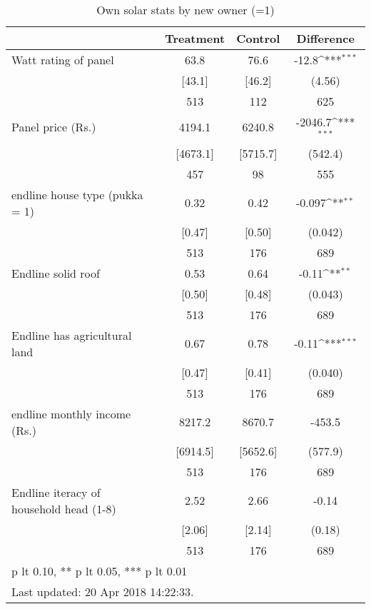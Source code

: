 \begin{table}[htbp]\centering
\def\sym#1{\ifmmode^{#1}\else\(^{#1}\)\fi}
\caption{Own solar stats by new owner (=1) \label{tab:"balance"}}
\begin{tabular*}{0.9\hsize}{@{\hskip\tabcolsep\extracolsep\fill}l*{1}{ccc}}
\toprule
                                &Treatment&  Control&Difference         \\
\midrule
Watt rating of panel            &     63.8&     76.6&    -12.8\sym{***}\\
                                &   [43.1]&   [46.2]&   (4.56)         \\
                                &      513&      112&      625         \\
Panel price (Rs.)               &   4194.1&   6240.8&  -2046.7\sym{***}\\
                                & [4673.1]& [5715.7]&  (542.4)         \\
                                &      457&       98&      555         \\
endline house type (pukka = 1)  &     0.32&     0.42&   -0.097\sym{**} \\
                                &   [0.47]&   [0.50]&  (0.042)         \\
                                &      513&      176&      689         \\
Endline solid roof              &     0.53&     0.64&    -0.11\sym{**} \\
                                &   [0.50]&   [0.48]&  (0.043)         \\
                                &      513&      176&      689         \\
Endline has agricultural land   &     0.67&     0.78&    -0.11\sym{***}\\
                                &   [0.47]&   [0.41]&  (0.040)         \\
                                &      513&      176&      689         \\
endline monthly income (Rs.)    &   8217.2&   8670.7&   -453.5         \\
                                & [6914.5]& [5652.6]&  (577.9)         \\
                                &      513&      176&      689         \\
Endline iteracy of household head (1-8)&     2.52&     2.66&    -0.14         \\
                                &   [2.06]&   [2.14]&   (0.18)         \\
                                &      513&      176&      689         \\
\bottomrule
\multicolumn{4}{l}{\footnotesize * p lt 0.10, ** p lt 0.05, *** p lt 0.01}\\
\multicolumn{4}{l}{\footnotesize Last updated: 20 Apr 2018 14:22:33.}\\
\end{tabular*}
\end{table}
